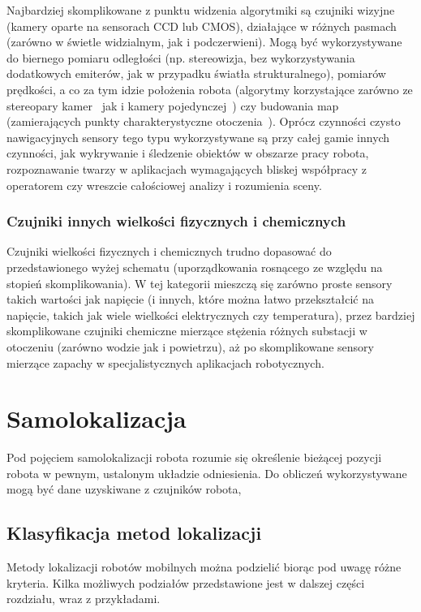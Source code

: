 Najbardziej skomplikowane z punktu widzenia algorytmiki są czujniki wizyjne
(kamery oparte na sensorach CCD lub CMOS), działające w różnych pasmach
(zarówno w świetle widzialnym, jak i podczerwieni). Mogą być wykorzystywane
do biernego pomiaru odległości (np. stereowizja, bez wykorzystywania dodatkowych
emiterów, jak w przypadku światła strukturalnego), pomiarów prędkości,
a co za tym idzie położenia robota (algorytmy korzystające zarówno ze stereopary
kamer~\cite{vodom_stereo} jak i kamery pojedynczej~\cite{vodom_mono}) czy budowania
map (zamierających punkty charakterystyczne otoczenia~\cite{vslam}). Oprócz
czynności czysto nawigacyjnych sensory tego typu wykorzystywane są przy całej
gamie innych czynności, jak wykrywanie i śledzenie obiektów w obszarze pracy robota,
rozpoznawanie twarzy w aplikacjach wymagających bliskej współpracy z operatorem
czy wreszcie całościowej analizy i rozumienia sceny.

\subsubsection{Czujniki innych wielkości fizycznych i chemicznych}

Czujniki wielkości fizycznych i chemicznych trudno dopasować do przedstawionego
wyżej schematu (uporządkowania rosnącego ze względu na stopień skomplikowania).
W tej kategorii mieszczą się zarówno proste sensory takich wartości jak
napięcie (i innych, które można łatwo przekształcić na napięcie, takich jak
wiele wielkości elektrycznych czy temperatura), przez bardziej skomplikowane
czujniki chemiczne mierzące stężenia różnych substacji w otoczeniu (zarówno
wodzie jak i powietrzu), aż po skomplikowane sensory mierzące zapachy
w specjalistycznych aplikacjach robotycznych.

\section{Samolokalizacja}

Pod pojęciem samolokalizacji robota rozumie się określenie bieżącej pozycji
robota w pewnym, ustalonym układzie odniesienia. Do obliczeń wykorzystywane mogą
być dane uzyskiwane z czujników robota,

\subsection{Klasyfikacja metod lokalizacji}

Metody lokalizacji robotów mobilnych można podzielić biorąc pod uwagę różne
kryteria. Kilka możliwych podziałów przedstawione jest w dalszej części
rozdziału, wraz z przykładami.

